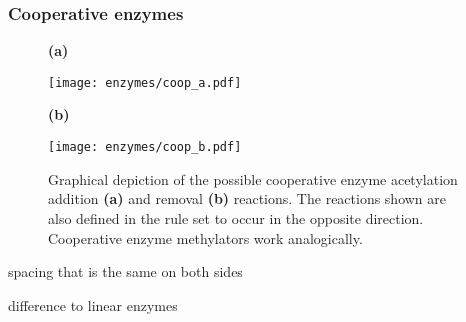             \subsubsection*{Cooperative enzymes}
                \begin{figure}[htpb!]
                    \centering
                    \begin{minipage}{0.97\textwidth}
                        \begin{minipage}{0.1\textwidth}
                            \caption*{\small \textbf{(a)}}
                        \end{minipage}
                        \begin{minipage}{0.86\textwidth}
                            \texttt{[image: enzymes/coop\_a.pdf]}
                        \end{minipage}
                    \end{minipage}
                    \begin{minipage}{0.97\textwidth}
                        \begin{minipage}{0.1\textwidth}
                            \caption*{\small \textbf{(b)}}
                        \end{minipage}
                        \begin{minipage}{0.86\textwidth}
                            \texttt{[image: enzymes/coop\_b.pdf]}
                        \end{minipage}
                    \end{minipage}
                    \caption{Graphical depiction of the possible cooperative enzyme acetylation addition \textbf{(a)} and removal \textbf{(b)} reactions. The reactions shown are also defined in the rule set to occur in the opposite direction. Cooperative enzyme methylators work analogically.}
                    \label{img:coopEnzymes}
                \end{figure}
                \begin{itemize}
                    {
                        \color{red}
                        \item spacing that is the same on both sides
                        \item difference to linear enzymes
                    }
                \end{itemize}
